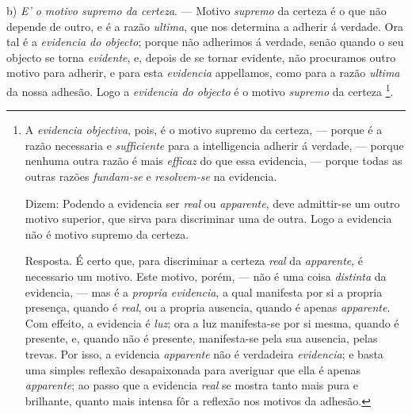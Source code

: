 b) \emph{E' o motivo supremo da certeza}. --- Motivo \emph{supremo} da certeza é o que não depende de outro, e é a razão \emph{ultima}, que nos determina a adherir á verdade. Ora tal é a \emph{evidencia do objecto}; porque não adherimos á verdade, senão quando o seu objecto se torna \emph{evidente}, e, depois de se tornar evidente, não procuramos outro motivo para adherir, e para esta \emph{evidencia} appellamos, como para a razão \emph{ultima} da nossa adhesão. Logo a \emph{evidencia do objecto} é o motivo \emph{supremo} da certeza \footnote{A \emph{evidencia objectiva}, pois, é o motivo supremo da certeza, --- porque é a razão necessaria e \emph{sufficiente} para a intelligencia adherir á verdade, --- porque nenhuma outra razão é mais \emph{efficaz} do que essa evidencia, --- porque todas as outras razões \emph{fundam-se} e \emph{resolvem-se} na evidencia.\par Dizem: Podendo a evidencia ser \emph{real} ou \emph{apparente}, deve admittir-se um outro motivo superior, que sirva para discriminar uma de outra. Logo a evidencia não é motivo supremo da certeza.\par Resposta. É certo que, para discriminar a certeza \emph{real} da \emph{apparente}, é necessario um motivo. Este motivo, porém, --- não é uma coisa \emph{distinta} da evidencia, --- mas é a \emph{propria evidencia}, a qual manifesta por si a propria presença, quando é \emph{real}, ou a propria ausencia, quando é apenas \emph{apparente}. Com effeito, a evidencia é \emph{luz}; ora a luz manifesta-se por si mesma, quando é presente, e, quando não é presente, manifesta-se pela sua ausencia, pelas trevas. Por isso, a evidencia \emph{apparente} não é verdadeira \emph{evidencia}; e basta uma simples reflexão desapaixonada para averiguar que ella é apenas \emph{apparente}; ao passo que a evidencia \emph{real} se mostra tanto mais pura e brilhante, quanto mais intensa fôr a reflexão nos motivos da adhesão.}.


